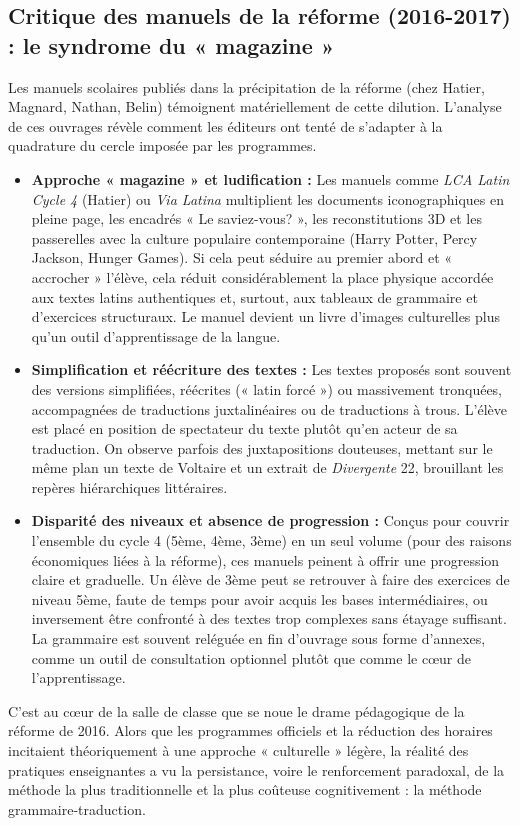 \subsection{Critique des manuels de la réforme (2016-2017) : le syndrome du « magazine »}

Les manuels scolaires publiés dans la précipitation de la réforme (chez Hatier, Magnard, Nathan,
Belin) témoignent matériellement de cette dilution.\cite{I-3-2-ref18} L'analyse de ces ouvrages
révèle comment les éditeurs ont tenté de s'adapter à la quadrature du cercle imposée par les
programmes.

\begin{itemize}\item \textbf{Approche « magazine » et ludification :} Les manuels comme \textit{LCA Latin Cycle 4} (Hatier) ou \textit{Via Latina} multiplient les documents iconographiques en pleine page, les encadrés « Le saviez-vous? », les reconstitutions 3D et les passerelles avec la culture populaire contemporaine (Harry Potter, Percy Jackson, Hunger Games).\cite{I-3-2-ref21} Si cela peut séduire au premier abord et « accrocher » l'élève, cela réduit considérablement la place physique accordée aux textes latins authentiques et, surtout, aux tableaux de grammaire et d'exercices structuraux. Le manuel devient un livre d'images culturelles plus qu'un outil d'apprentissage de la langue.\item \textbf{Simplification et réécriture des textes :} Les textes proposés sont souvent des versions simplifiées, réécrites (« latin forcé ») ou massivement tronquées, accompagnées de traductions juxtalinéaires ou de traductions à trous. L'élève est placé en position de spectateur du texte plutôt qu'en acteur de sa traduction. On observe parfois des juxtapositions douteuses, mettant sur le même plan un texte de Voltaire et un extrait de \textit{Divergente} 22, brouillant les repères hiérarchiques littéraires.\item \textbf{Disparité des niveaux et absence de progression :} Conçus pour couvrir l'ensemble du cycle 4 (5ème, 4ème, 3ème) en un seul volume (pour des raisons économiques liées à la réforme), ces manuels peinent à offrir une progression claire et graduelle. Un élève de 3ème peut se retrouver à faire des exercices de niveau 5ème, faute de temps pour avoir acquis les bases intermédiaires, ou inversement être confronté à des textes trop complexes sans étayage suffisant.\cite{I-3-2-ref18} La grammaire est souvent reléguée en fin d'ouvrage sous forme d'annexes, comme un outil de consultation optionnel plutôt que comme le cœur de l'apprentissage.\end{itemize}C'est au cœur de la salle de classe que se noue le drame pédagogique de la réforme de 2016. Alors
que les programmes officiels et la réduction des horaires incitaient théoriquement à une approche «
culturelle » légère, la réalité des pratiques enseignantes a vu la persistance, voire le
renforcement paradoxal, de la méthode la plus traditionnelle et la plus coûteuse cognitivement : la
méthode grammaire-traduction.




